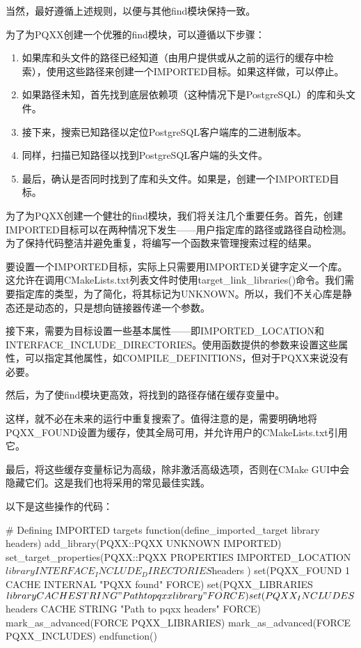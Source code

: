 当然，最好遵循上述规则，以便与其他find模块保持一致。

为了为PQXX创建一个优雅的find模块，可以遵循以下步骤：

\begin{enumerate}
\item
如果库和头文件的路径已经知道（由用户提供或从之前的运行的缓存中检索），使用这些路径来创建一个IMPORTED目标。如果这样做，可以停止。

\item
如果路径未知，首先找到底层依赖项（这种情况下是PostgreSQL）的库和头文件。

\item
接下来，搜索已知路径以定位PostgreSQL客户端库的二进制版本。

\item
同样，扫描已知路径以找到PostgreSQL客户端的头文件。

\item
最后，确认是否同时找到了库和头文件。如果是，创建一个IMPORTED目标。
\end{enumerate}

为了为PQXX创建一个健壮的find模块，我们将关注几个重要任务。首先，创建IMPORTED目标可以在两种情况下发生——用户指定库的路径或路径自动检测。为了保持代码整洁并避免重复，将编写一个函数来管理搜索过程的结果。


要设置一个IMPORTED目标，实际上只需要用IMPORTED关键字定义一个库。这允许在调用CMakeLists.txt列表文件时使用target\_link\_libraries()命令。我们需要指定库的类型，为了简化，将其标记为UNKNOWN。所以，我们不关心库是静态还是动态的，只是想向链接器传递一个参数。

接下来，需要为目标设置一些基本属性——即IMPORTED\_LOCATION和INTERFACE\_INCLUDE\_DIRECTORIES。使用函数提供的参数来设置这些属性，可以指定其他属性，如COMPILE\_DEFINITIONS，但对于PQXX来说没有必要。

然后，为了使find模块更高效，将找到的路径存储在缓存变量中。

这样，就不必在未来的运行中重复搜索了。值得注意的是，需要明确地将PQXX\_FOUND设置为缓存，使其全局可用，并允许用户的CMakeLists.txt引用它。

最后，将这些缓存变量标记为高级，除非激活高级选项，否则在CMake GUI中会隐藏它们。这是我们也将采用的常见最佳实践。

以下是这些操作的代码：


\begin{cmake}
# Defining IMPORTED targets
function(define_imported_target library headers)
    add_library(PQXX::PQXX UNKNOWN IMPORTED)
    set_target_properties(PQXX::PQXX PROPERTIES
        IMPORTED_LOCATION ${library}
        INTERFACE_INCLUDE_DIRECTORIES ${headers}
    )
    set(PQXX_FOUND 1 CACHE INTERNAL "PQXX found" FORCE)
    set(PQXX_LIBRARIES ${library}
        CACHE STRING "Path to pqxx library" FORCE)
    set(PQXX_INCLUDES ${headers}
        CACHE STRING "Path to pqxx headers" FORCE)
    mark_as_advanced(FORCE PQXX_LIBRARIES)
    mark_as_advanced(FORCE PQXX_INCLUDES)
endfunction()
\end{cmake}

